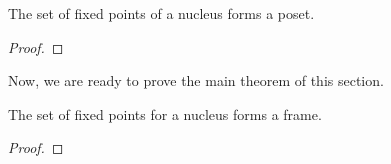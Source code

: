 \begin{prop}
  The set of fixed points of a nucleus forms a poset.
\end{prop}
\begin{proof}
\end{proof}

Now, we are ready to prove the main theorem of this section.

\begin{thm}\label{thm:fixed-point-frame}
  The set of fixed points for a nucleus forms a frame.
\end{thm}
\begin{proof}
\end{proof}

